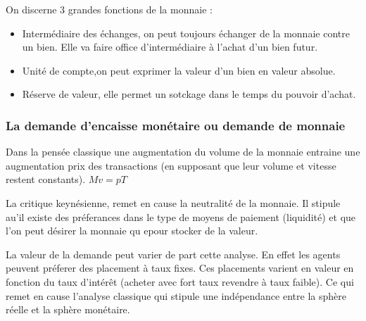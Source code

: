 On discerne 3 grandes fonctions de la monnaie : 

\begin{itemize}[label=]
	\item Intermédiaire des échanges, on peut toujours échanger de la monnaie contre un bien. Elle va faire office d'intermédiaire à l'achat d'un bien futur.
	\item Unité de compte,on peut exprimer la valeur d'un bien en valeur absolue.
	\item Réserve de valeur, elle permet un sotckage dans le temps du pouvoir d'achat.
\end{itemize}


\subsubsection{La demande d'encaisse monétaire ou demande de monnaie} %
\label{sub:la_demande_d_encaisse_monetaire_ou_demande_de_monnaie}
Dans la pensée classique une augmentation du volume de la monnaie entraine une augmentation prix des transactions (en supposant que leur volume et vitesse restent constants). $Mv=pT$

La critique keynésienne, remet en cause la neutralité de la monnaie. Il stipule au'il existe des préferances dans le type de moyens de paiement (liquidité)
et que l'on peut désirer la monnaie qu epour stocker de  la valeur.

La valeur de la demande peut varier de part cette analyse. En effet les agents peuvent préferer des placement à taux fixes. Ces placements varient en valeur
en fonction du taux d'intérêt (acheter avec fort taux revendre à taux faible). Ce qui remet en cause l'analyse classique qui stipule une indépendance entre 
la sphère réelle et la sphère monétaire.

